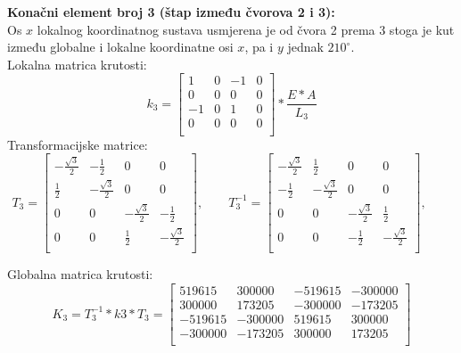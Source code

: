 \documentclass[a4paper,twoside,12pt]{memoir} %
\begin{document}
\textbf{Konačni element broj 3 (štap između čvorova 2 i 3):} \\
Os $x$ lokalnog koordinatnog sustava usmjerena je od čvora 2 prema 3 stoga je kut između globalne i lokalne koordinatne osi $x$, pa i $y$ jednak $210^\circ$. \\
Lokalna matrica krutosti:
\begin{equation}
    k_3 = 
    \begin{bmatrix}
    1 & 0 & -1 & 0 \\
    0 & 0 & 0 & 0 \\
    -1 & 0 & 1 & 0 \\
    0 & 0 & 0 & 0 \\
    \end{bmatrix} * \frac{E * A}{L_3}
\end{equation}
Transformacijske matrice:
\begin{equation}
    T_3 =
    \begin{bmatrix}
    -\frac{\sqrt{3}}{2} & -\frac{1}{2} & 0 & 0 \\
    \frac{1}{2} & -\frac{\sqrt{3}}{2} & 0 & 0 \\
    0 & 0 & -\frac{\sqrt{3}}{2} & -\frac{1}{2} \\
    0 & 0 & \frac{1}{2} & -\frac{\sqrt{3}}{2} \\
    \end{bmatrix}, \qquad
    T^{-1}_3 =
    \begin{bmatrix}
    -\frac{\sqrt{3}}{2} & \frac{1}{2} & 0 & 0 \\
    -\frac{1}{2} & -\frac{\sqrt{3}}{2} & 0 & 0 \\
    0 & 0 & -\frac{\sqrt{3}}{2} & \frac{1}{2} \\
    0 & 0 & -\frac{1}{2} & -\frac{\sqrt{3}}{2} \\
    \end{bmatrix}, \qquad
\end{equation}

Globalna matrica krutosti:
\begin{equation}
    K_3 = T^{-1}_3 * k3 * T_3 =
    \begin{bmatrix}
    519615 & 300000 & -519615 & -300000 \\
    300000 & 173205 & -300000 & -173205 \\
    -519615 & -300000 & 519615 & 300000 \\
    -300000 & -173205 & 300000 & 173205 \\
    \end{bmatrix}
\end{equation}
\end{document}
